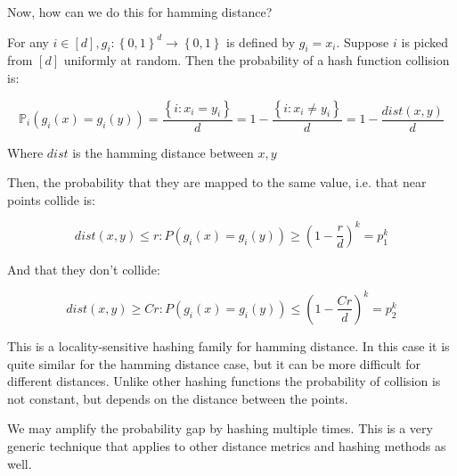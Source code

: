 \documentclass[../notes.tex]{subfiles}
\begin{document}
Now, how can we do this for hamming distance?

\begin{definition}
    For any $ i \in \left[ d \right], g_i : \left\{ 0, 1\right\}^d \to \left\{ 0, 1 \right\} $ is defined by $ g_i = x_i $.
    Suppose $ i $ is picked from $ \left[ d \right] $ uniformly at random.
    Then the probability of a hash function collision is:

    \begin{equation}
        \mathbb{P}_i(g_i(x) = g_i(y) ) = \frac{\left\{ i: x_i = y_i \right\} }{d} = 1 - \frac{\left\{ i: x_i \neq  y_i \right\} }{d} = 1- \frac{dist(x,y)}{d}
    \end{equation}

    Where $ dist $ is the hamming distance between $ x, y $
\end{definition}

Then, the probability that they are mapped to the same value, i.e. that near points collide is:

\begin{equation}
    dist(x,y) \le  r : P(g_i(x) = g_i(y)) \ge (1 - \frac{r}{d})^k = p_1^k
\end{equation}

And that they don't collide:

\begin{equation}
    dist(x,y) \ge  Cr : P(g_i(x) = g_i(y)) \le  (1 - \frac{Cr}{d})^k = p_2^k
\end{equation}


This is a locality-sensitive hashing family for hamming distance. 
In this case it is quite similar for the hamming distance case, but it can be more difficult for different distances.
Unlike other hashing functions the probability of collision is not constant, but depends on the distance between the points.


We may amplify the probability gap by hashing multiple times. This is a very generic technique that applies to other distance metrics and hashing methods as well.
\end{document}
